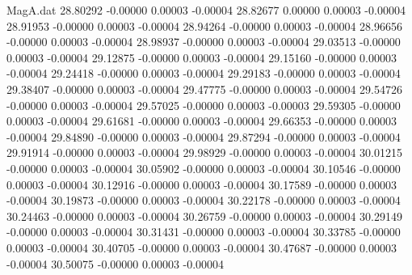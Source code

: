 \begin{filecontents}{MagA.dat}
  28.80292   -0.00000    0.00003   -0.00004
  28.82677    0.00000    0.00003   -0.00004
  28.91953   -0.00000    0.00003   -0.00004
  28.94264   -0.00000    0.00003   -0.00004
  28.96656   -0.00000    0.00003   -0.00004
  28.98937   -0.00000    0.00003   -0.00004
  29.03513   -0.00000    0.00003   -0.00004
  29.12875   -0.00000    0.00003   -0.00004
  29.15160   -0.00000    0.00003   -0.00004
  29.24418   -0.00000    0.00003   -0.00004
  29.29183   -0.00000    0.00003   -0.00004
  29.38407   -0.00000    0.00003   -0.00004
  29.47775   -0.00000    0.00003   -0.00004
  29.54726   -0.00000    0.00003   -0.00004
  29.57025   -0.00000    0.00003   -0.00003
  29.59305   -0.00000    0.00003   -0.00004
  29.61681   -0.00000    0.00003   -0.00004
  29.66353   -0.00000    0.00003   -0.00004
  29.84890   -0.00000    0.00003   -0.00004
  29.87294   -0.00000    0.00003   -0.00004
  29.91914   -0.00000    0.00003   -0.00004
  29.98929   -0.00000    0.00003   -0.00004
  30.01215   -0.00000    0.00003   -0.00004
  30.05902   -0.00000    0.00003   -0.00004
  30.10546   -0.00000    0.00003   -0.00004
  30.12916   -0.00000    0.00003   -0.00004
  30.17589   -0.00000    0.00003   -0.00004
  30.19873   -0.00000    0.00003   -0.00004
  30.22178   -0.00000    0.00003   -0.00004
  30.24463   -0.00000    0.00003   -0.00004
  30.26759   -0.00000    0.00003   -0.00004
  30.29149   -0.00000    0.00003   -0.00004
  30.31431   -0.00000    0.00003   -0.00004
  30.33785   -0.00000    0.00003   -0.00004
  30.40705   -0.00000    0.00003   -0.00004
  30.47687   -0.00000    0.00003   -0.00004
  30.50075   -0.00000    0.00003   -0.00004
\end{filecontents}
